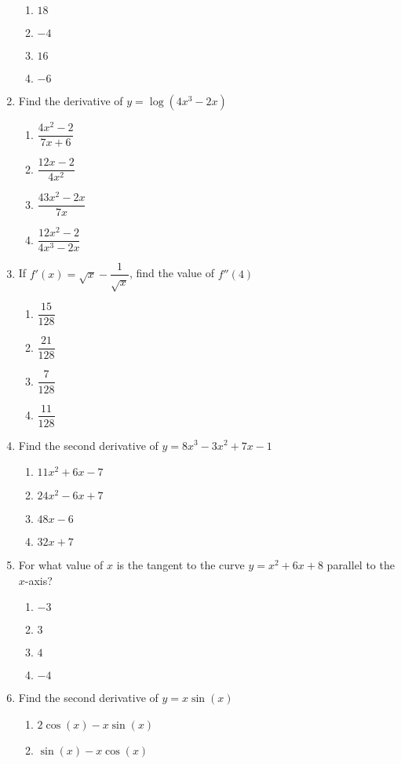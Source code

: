 \begin{multicols}{2}
\begin{enumerate}[label={\arabic*.}]
\begin{enumerate}[label={\Alph*.}]
\item \(18\)
\item \(-4\)
\item \(16\)
\item \(-6\)
\end{enumerate}
\item Find the derivative of  \(y = \log(4{x}^{3} - 2x)\)
\begin{enumerate}[label={\Alph*.}]
\item \(\dfrac{4{x}^{2}-2}{7x+6}\)
\item \(\dfrac{12x-2}{4{x}^{2}}\)
\item \(\dfrac{43{x}^{2}-2x}{7x}\)
\item \(\dfrac{12{x}^{2}-2}{4{x}^{3}-2x}\)
\end{enumerate}
\item If \(f'(x) = \sqrt{x} - \dfrac{1}{\sqrt{x}}\), find the value of \(f''(4)\)
\begin{enumerate}[label={\Alph*.}]
\item \(\dfrac{15}{128}\)
\item \(\dfrac{21}{128}\)
\item \(\dfrac{7}{128}\)
\item \(\dfrac{11}{128}\)
\end{enumerate}
\item Find the second derivative of \(y = 8{x}^{3} - 3{x}^{2} + 7x - 1\)
\begin{enumerate}[label={\Alph*.}]
\item \(11{x}^{2} + 6x - 7\)
\item \(24{x}^{2} - 6x + 7\)
\item \(48x - 6\)
\item \(32x + 7\)
\end{enumerate}
\item For what value of \(x\) is the tangent to the curve \(y = x^{2} + 6x + 8\) parallel to the \(x\)-axis?
\begin{enumerate}[label={\Alph*.}]
\item \(-3\)
\item \(3\)
\item \(4\)
\item \(-4\)
\end{enumerate}
\item Find the second derivative of \(y = x\sin(x)\)
\begin{enumerate}[label={\Alph*.}]
\item \(2\cos(x) - x \sin(x)\)
\item \(\sin(x) - x \cos(x)\)

\end{enumerate}
\end{enumerate}
\end{multicols}
